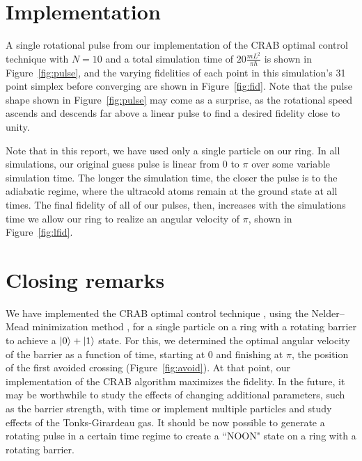\documentclass[paper=a4wide, fontsize=12pt]{scrartcl}	 %
\begin{document}
\section*{Implementation}

A single rotational pulse from our implementation of the CRAB optimal control technique with $N = 10$ and a total simulation time of $20 \frac{mL^2}{\pi\hbar}$ is shown in Figure~\ref{fig:pulse}, and the varying fidelities of each point in this simulation's 31 point simplex before converging are shown in Figure~\ref{fig:fid}. Note that the pulse shape shown in Figure~\ref{fig:pulse} may come as a surprise, as the rotational speed ascends and descends far above a linear pulse to find a desired fidelity close to unity.

Note that in this report, we have used only a single particle on our ring. In all simulations, our original guess pulse is linear from 0 to $\pi$ over some variable simulation time. The longer the simulation time, the closer the pulse is to the adiabatic regime, where the ultracold atoms remain at the ground state at all times. The final fidelity of all of our pulses, then, increases with the simulations time we allow our ring to realize an angular velocity of $\pi$, shown in Figure~\ref{fig:lfid}.

\section*{Closing remarks}

We have implemented the CRAB optimal control technique \cite{CRAB}, using the Nelder--Mead minimization method \cite{SIMPLEX}, for a single particle on a ring with a rotating barrier \cite{RING} to achieve a $\ket{0}+\ket{1}$ state. For this, we determined the optimal angular velocity of the barrier as a function of time, starting at 0 and finishing at $\pi$, the position of the first avoided crossing (Figure~\ref{fig:avoid}). At that point, our implementation of the CRAB algorithm maximizes the fidelity. In the future, it may be worthwhile to study the effects of changing additional parameters, such as the barrier strength, with time or implement multiple particles and study effects of the Tonks-Girardeau gas. It should be now possible to generate a rotating pulse in a certain time regime to create a ``NOON" state on a ring with a rotating barrier.
 

\end{document}
